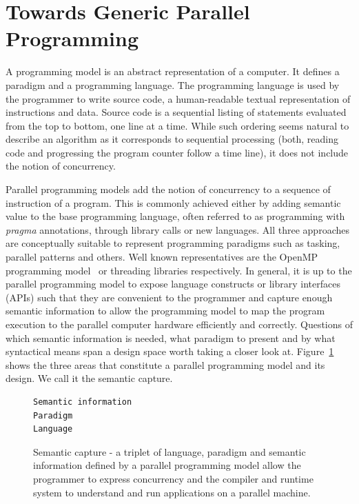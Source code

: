 \section{Towards Generic Parallel Programming}\label{chap:background}

A programming model is an abstract representation of a computer. It defines a paradigm and a programming language. The programming language is used by the programmer to write source code, a human-readable textual representation of instructions and data. Source code is a sequential listing of statements evaluated from the top to bottom, one line at a time. While such ordering seems natural to describe an algorithm as it corresponds to sequential processing (both, reading code and progressing the program counter follow a time line), it does not include the notion of concurrency.

Parallel programming models add the notion of concurrency to a sequence of instruction of a program. This is commonly achieved either by adding semantic value to the base programming language, often referred to as programming with \emph{pragma} annotations, through library calls or new languages. All three approaches are conceptually suitable to represent programming paradigms such as tasking, parallel patterns and others. Well known representatives are the OpenMP programming model~\cite{CITEOPENMP} or threading libraries respectively. In general, it is up to the parallel programming model to expose language constructs or library interfaces (APIs) such that they are convenient to the programmer and capture enough semantic information to allow the programming model to map the program execution to the parallel computer hardware efficiently and correctly. Questions of which semantic information is needed, what paradigm to present and by what syntactical means span a design space worth taking a closer look at. Figure~\ref{figSemCapture} shows the three areas that constitute a parallel programming model and its design. We call it the semantic capture.

\begin{figure}[h]
\begin{Verbatim}[frame=leftline]
Semantic information
Paradigm 
Language
\end{Verbatim}
\caption{Semantic capture - a triplet of language, paradigm and semantic information defined by a parallel programming model allow the programmer to express concurrency and the compiler and runtime system to understand and run applications on a parallel machine.}
\label{figSemCapture}
\end{figure}

